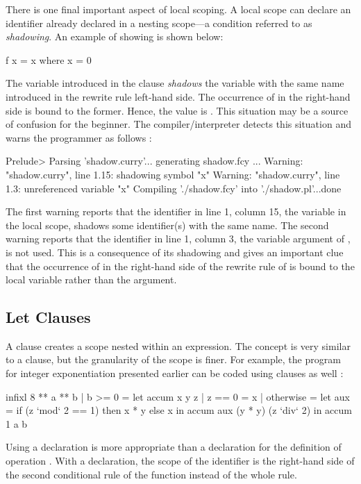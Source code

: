 There is one final important aspect of local scoping.
A local scope can declare an identifier already declared
in a nesting scope---a condition referred to as
\emph{shadowing}.
An example of showing is shown below:
%
\begin{prog}
f x = x where x = 0
\end{prog}
%
The variable  introduced in the  clause
\emph{shadows} the variable with the same name introduced in
the rewrite rule left-hand side.
The occurrence of  in the right-hand side is
bound to the former.
Hence, the value  is .
This situation may be a source of confusion for the beginner.
The \pakcs{} compiler/interpreter detects this situation and
warns the programmer as follows
:
%
\begin{prog}
Prelude> 
Parsing 'shadow.curry'...
generating shadow.fcy ...
Warning: "shadow.curry", line 1.15: shadowing symbol "x"
Warning: "shadow.curry", line 1.3: unreferenced variable "x"
Compiling './shadow.fcy' into './shadow.pl'...done
\end{prog}
%
The first warning reports that the identifier in line 1,
column 15, the variable  in the local scope,
shadows some identifier(s) with the same name.
The second warning reports that
the identifier in line 1, column 3,
the variable  argument of ,
is not used.  This is a consequence of its shadowing and
gives an important clue that the occurrence of 
in the right-hand side of the rewrite rule of 
is bound to the local variable rather than the argument.

\subsection{{\selectfont Let} Clauses}
\label{let-clause}

A 
clause creates a scope nested within an expression.
The concept is very similar to a  clause,
but the granularity of the scope is finer.
For example, the program for integer exponentiation
presented earlier can be coded using  clauses
as well
:
%
\begin{prog}
infixl 8 **
a ** b | b >= 0 = 
  let accum x y z | z == 0    = x
                  | otherwise =
                       let aux = if (z `mod` 2 == 1) then x * y else x
                       in  accum aux (y * y) (z `div` 2)
  in  accum 1 a b
\end{prog}
%
Using a  declaration is more appropriate than a
 declaration for the definition of operation .
With a  declaration, the scope of the identifier 
is the right-hand side of the second conditional rule of
the function  instead of the whole rule.

